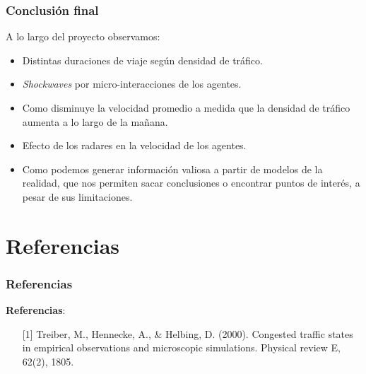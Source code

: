 \documentclass[10pt, compress]{beamer}
\begin{document}
\begin{frame}
\frametitle{Conclusi\'on final}

A lo largo del proyecto observamos:
\begin{itemize}
\item Distintas duraciones de viaje seg\'un densidad de tr\'afico.
\item \textit{Shockwaves} por micro-interacciones de los agentes.
\item Como disminuye la velocidad promedio a medida que la densidad de tr\'afico aumenta a lo largo de la mañana.
\item Efecto de los radares en la velocidad de los agentes.
\item Como podemos generar informaci\'on valiosa a partir de modelos de la realidad, que nos permiten sacar conclusiones o encontrar puntos de inter\'es, a pesar de sus limitaciones.
\end{itemize}
\end{frame}

\section{Referencias}

\begin{frame}[fragile]

\frametitle{Referencias}

\textbf{Referencias}:
\begin{itemize}
\item [{[1]}] Treiber, M., Hennecke, A., \& Helbing, D. (2000). Congested traffic states in empirical observations and microscopic simulations. Physical review E, 62(2), 1805.
\end{itemize}

\end{frame}
\end{document}
